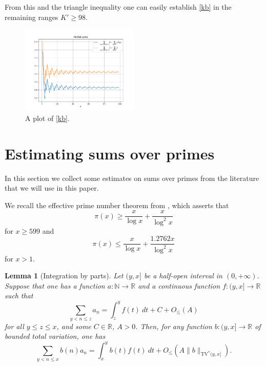 \documentclass[12pt,a4paper,reqno]{amsart}
\numberwithin{equation}{section}
\theoremstyle{plain}
\newtheorem{lemma}[theorem]{Lemma}
\theoremstyle{definition}
\newcommand\R{\mathbb{R}}
\newcommand\N{\mathbb{N}}
\begin{document}
    From this and the triangle inequality one can easily establish \eqref{kb} in the remaining ranges $K' \geq 98$.
  
  \begin{figure}
  \centering
  \includegraphics[width=0.5\textwidth]{discrepancy.png}
  \caption{A plot of \eqref{kb}.}
  \label{fig:kb}
  \end{figure}

\section{Estimating sums over primes}\label{primes-sec}

In this section we collect some estimates on sums over primes from the literature that we will use in this paper.

We recall the effective prime number theorem from \cite[Corollary 5.2]{dusart}, which asserts that
\begin{equation}\label{pi-lower}
  \pi(x) \geq \frac{x}{\log x} + \frac{x}{\log^2 x}
\end{equation}
for $x \geq 599$ and
\begin{equation}\label{pi-upper}
  \pi(x) \leq \frac{x}{\log x} + \frac{1.2762 x}{\log^2 x}
\end{equation}
for $x >1$.  


\begin{lemma}[Integration by parts]\label{integ-lemma}  Let $(y,x]$ be a half-open interval in $(0,+\infty)$.  Suppose that one has a function $a \colon \N \to \R$ and a continuous function $f: (y,x] \to \R$ such that 
  $$ \sum_{y < n \leq z} a_n = \int_z^y f(t)\ dt + C + O_{\leq}(A)$$
  for all $y \leq z \leq x$, and some $C \in \R$, $A>0$.  Then, for any function $b: (y,x] \to \R$ of bounded total variation, one has
\begin{equation}\label{tve}
   \sum_{y < n \leq x} b(n) a_n = \int_x^y b(t) f(t)\ dt + O_{\leq}(A\|b\|_{\mathrm{TV}^*(y,x]}).
\end{equation}
\end{lemma}
\end{document}
